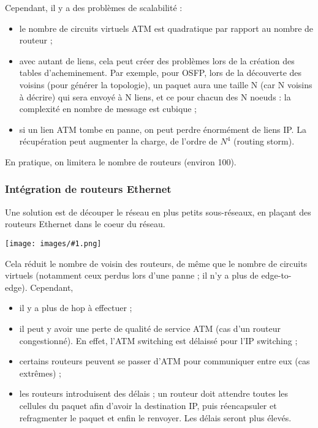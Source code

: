 \documentclass[10pt,a4paper]{report}
\newcommand{\dessin}[1]{\begin{center}\texttt{[image: images/\#1.png]}\end{center}}
\begin{document}
			Cependant, il y a des problèmes de scalabilité :
	
			\begin{itemize}
				\item le nombre de circuits virtuels ATM est quadratique par rapport au nombre de routeur ;
				\item avec autant de liens, cela peut créer des problèmes lors de la création des tables d'acheminement. Par exemple, pour OSFP, lors de la découverte des voisins (pour générer la topologie), un paquet aura une taille N (car N voisins à décrire) qui sera envoyé à N liens, et ce pour chacun des N noeuds : la complexité en nombre de message est cubique ;
				\item si un lien ATM tombe en panne, on peut perdre énormément de liens IP. La récupération peut augmenter la charge, de l'ordre de $N^4$ (routing storm).
			\end{itemize}
	
			En pratique, on limitera le nombre de routeurs (environ 100).

			\subsubsection{Intégration de routeurs Ethernet}
			
			Une solution est de découper le réseau en plus petits sous-réseaux, en plaçant des routeurs Ethernet dans le coeur du réseau.
	
			\dessin{15}
	
			Cela réduit le nombre de voisin des routeurs, de même que le nombre de circuits virtuels (notamment ceux perdus lors d'une panne ; il n'y a plus de edge-to-edge). Cependant,
			\begin{itemize}
				\item il y a plus de hop à effectuer ;
				\item il peut y avoir une perte de qualité de service ATM (cas d'un routeur congestionné). En effet, l'ATM switching est délaissé pour l'IP switching ;
				\item certains routeurs peuvent se passer d'ATM pour communiquer entre eux (cas extrêmes) ;
				\item les routeurs introduisent des délais ; un routeur doit attendre toutes les cellules du paquet afin d'avoir la destination IP, puis réencapsuler et refragmenter le paquet et enfin le renvoyer. Les délais seront plus élevés.
			\end{itemize}
			
\end{document}
